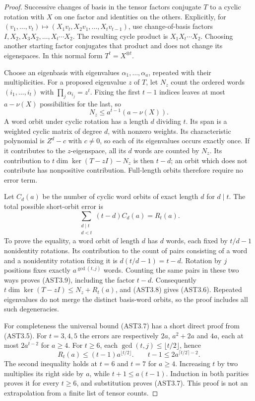 \begin{proof}
Successive changes of basis in the tensor factors conjugate $T$
to a cyclic rotation with $X$ on one factor and identities on the
others.  Explicitly, for
$(v_1,\ldots,v_t)\mapsto(X_1v_t,X_2v_1,\ldots,X_tv_{t-1})$,
use change-of-basis factors
$I,X_2,X_3X_2,\ldots,X_t\cdots X_2$.  The resulting cycle
product is $X_1X_t\cdots X_2$.  Choosing another starting factor
conjugates that product and does not change its eigenspaces.
In this normal form $T^t=X^{\otimes t}$.

Choose an eigenbasis with eigenvalues $\alpha_1,\ldots,\alpha_a$,
repeated with their multiplicities.  For a proposed eigenvalue $z$
of $T$, let $N_z$ count the ordered words $(i_1,\ldots,i_t)$
with $\prod_j\alpha_{i_j}=z^t$.  Fixing the first $t-1$
indices leaves at most $a-\nu(X)$ possibilities for the last,
so
\[
                         N_z\le a^{t-1}(a-\nu(X)).             \tag{AST3.8}
\]
A word orbit under cyclic rotation has a length $d$ dividing $t$.
Its span is a weighted cyclic matrix of degree $d$, with nonzero
weights.  Its characteristic polynomial is $Z^d-c$ with $c\ne0$,
so each of its eigenvalues occurs exactly once.  If it contributes
to the $z$-eigenspace, all its $d$ words are counted by $N_z$.
Its contribution to $t\dim\ker(T-zI)-N_z$ is then $t-d$;
an orbit which does not contribute has nonpositive contribution.
Full-length orbits therefore require no error term.

Let $C_d(a)$ be the number of cyclic word orbits of exact length
$d$ for $d\mid t$.  The total possible short-orbit error is
\[
 \sum_{\substack{d\mid t\\d<t}}(t-d)C_d(a)=R_t(a).            \tag{AST3.9}
\]
To prove the equality, a word orbit of length $d$ has $d$ words,
each fixed by $t/d-1$ nonidentity rotations.  Its contribution to
the count of pairs consisting of a word and a nonidentity rotation
fixing it is $d(t/d-1)=t-d$.  Rotation by $j$ positions fixes
exactly $a^{\gcd(t,j)}$ words.  Counting the same pairs in these
two ways proves (AST3.9), including the factor $t-d$.
Consequently $t\dim\ker(T-zI)\le N_z+R_t(a)$, and (AST3.8)
gives (AST3.6).  Repeated eigenvalues do not merge the distinct
basis-word orbits, so the proof includes all such degeneracies.

For completeness the universal bound (AST3.7) has a short direct
proof from (AST3.5).  For $t=3,4,5$ the errors are respectively
$2a$, $a^2+2a$ and $4a$, each at most $2a^{t-2}$ for $a\ge4$.
For $t\ge6$, each $\gcd(t,j)\le\lfloor t/2\rfloor$, hence
\[
 R_t(a)\le(t-1)a^{\lfloor t/2\rfloor}.
 \qquad
 t-1\le2a^{\lceil t/2\rceil-2}.                              \tag{AST3.10}
\]
The second inequality holds at $t=6$ and $t=7$ for $a\ge4$.
Increasing $t$ by two multiplies its right side by $a$, while
$t+1\le a(t-1)$.  Induction in both parities proves it for every
$t\ge6$, and substitution proves (AST3.7).  This proof is not an
extrapolation from a finite list of tensor counts.
\end{proof}

